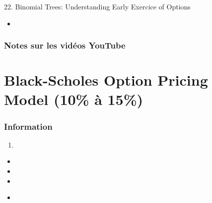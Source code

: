 \documentclass[12pt, titlepage, french]{report}
\begin{document}
\begin{CHPT_SUMM_AUTO}[label = {L.-22}]{22. Binomial Trees: Understanding Early Exercice of Options}
	\begin{itemize}
		\item	
	\end{itemize}
\end{CHPT_SUMM_AUTO}

\subsection{Notes sur les vidéos YouTube}


\newpage

\chapter[Black-Scholes Option Pricing Model]{Black-Scholes Option Pricing Model (10\% à 15\%)}

\subsection{Information}

\begin{distributions}[Objective]

\end{distributions}

\begin{outcomes}
\begin{enumerate}
	\item	
\end{enumerate}
\end{outcomes}

\begin{ASM_chapter}
\begin{itemize}
	\item	{}
	\item	{}
	\item	{}
\end{itemize}
\end{ASM_chapter}

\begin{YTB_vids}
\begin{itemize}
	\item	
\end{itemize}
\end{YTB_vids}
\end{document}
